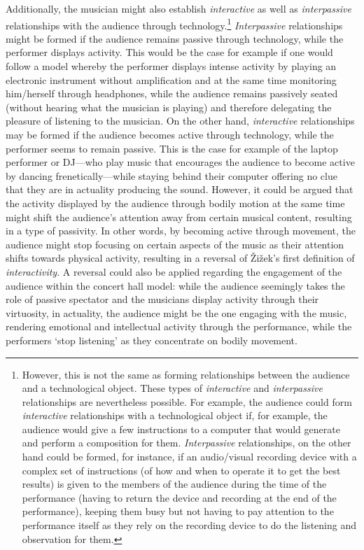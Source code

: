 Additionally, the musician might also establish \emph{interactive} as well as \emph{interpassive} relationships with the audience through technology.\footnote{However, this is not the same as forming relationships between the audience and a technological object. These types of \emph{interactive} and \emph{interpassive} relationships are nevertheless possible. For example, the audience could form \emph{interactive} relationships with a technological object if, for example, the audience would give a few instructions to a computer that would generate and perform a composition for them. \emph{Interpassive} relationships, on the other hand could be formed, for instance, if an audio/visual recording device with a complex set of instructions (of how and when to operate it to get the best results) is given to the members of the audience during the time of the performance (having to return the device and recording at the end of the performance), keeping them busy but not having to pay attention to the performance itself as they rely on the recording device to do the listening and observation for them.} \emph{Interpassive} relationships might be formed if the audience remains passive through technology, while the performer displays activity. This would be the case for example if one would follow a model whereby the performer displays intense activity by playing an electronic instrument without amplification and at the same time monitoring him/herself through headphones, while the audience remains passively seated (without hearing what the musician is playing) and therefore delegating the pleasure of listening to the musician. On the other hand, \emph{interactive} relationships may be formed if the audience becomes active through technology, while the performer seems to remain passive. This is the case for example of the laptop performer or DJ---who play music that encourages the audience to become active by dancing frenetically---while staying behind their computer offering no clue that they are in actuality producing the sound. However, it could be argued that the activity displayed by the audience through bodily motion at the same time might shift the audience's attention away from certain musical content, resulting in a type of passivity. In other words, by becoming active through movement, the audience might stop focusing on certain aspects of the music as their attention shifts towards physical activity, resulting in a reversal of \v{Z}i\v{z}ek's first definition of \emph{interactivity}. A reversal could also be applied regarding the engagement of the audience within the concert hall model: while the audience seemingly takes the role of passive spectator and the musicians display activity through their virtuosity, in actuality, the audience might be the one engaging with the music, rendering emotional and intellectual activity through the performance, while the performers `stop listening' as they concentrate on bodily movement.  

